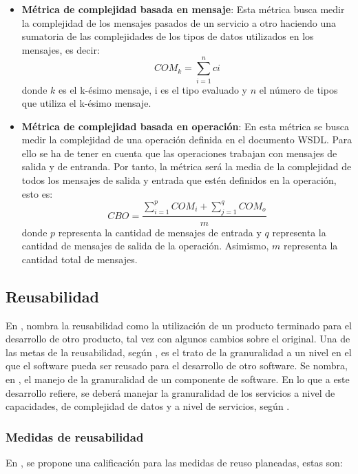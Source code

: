 \begin{itemize}

 \item \textbf{Métrica de complejidad basada en mensaje}: Esta métrica busca medir la complejidad de los mensajes pasados de un servicio a otro haciendo una sumatoria de las complejidades de los tipos de datos utilizados en los mensajes, es decir: $$COM_{k} = \sum_{i=1}^{n} ci$$ donde $k$ es el k-ésimo mensaje, i es el tipo evaluado y $n$ el número de tipos que utiliza el k-ésimo mensaje.
 \item \textbf{Métrica de complejidad basada en operación}: En esta métrica se busca medir la complejidad de una operación definida en el documento WSDL. Para ello se ha de tener en cuenta que las operaciones trabajan con mensajes de salida y de entranda. Por tanto, la métrica será la media de la complejidad de todos los mensajes de salida y entrada que estén definidos en la operación, esto es: $$CBO = \frac{\sum_{i=1}^{p} COM_{i} + \sum_{j=1}^{q} COM_{o}}{m}$$ donde $p$ representa la cantidad de mensajes de entrada y $q$ representa la cantidad de mensajes de salida de la operación. Asimismo, $m$ representa la cantidad total de mensajes.

\end{itemize}

\subsection{Reusabilidad}

En \cite{computer_science}, nombra la reusabilidad como la utilización de un producto terminado para el desarrollo de otro producto, tal vez con algunos cambios sobre el original. Una de las metas de la reusabilidad, según \cite{computer_science}, es el trato de la granuralidad a un nivel en el que el software pueda ser reusado para el desarrollo de otro software. Se nombra, en \cite{computer_science}, el manejo de la granuralidad de un componente de software. En lo que a este desarrollo refiere, se deberá manejar la granuralidad de los servicios a nivel de capacidades, de complejidad de datos y a nivel de servicios, según \cite{soa_principles}.

\subsubsection{Medidas de reusabilidad}

 En \cite{soa_principles}, se propone una calificación para las medidas de reuso planeadas, estas son:

